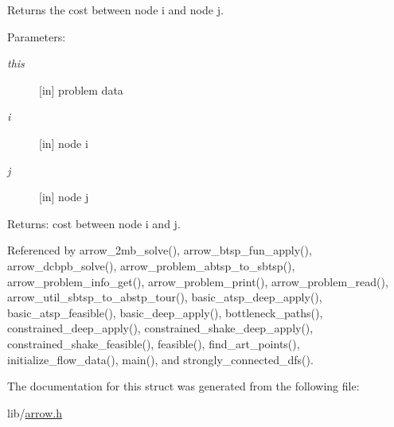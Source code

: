 Returns the cost between node i and node j. 

\begin{Desc}
\item[Parameters:]
\begin{description}
\item[{\em this}]\mbox{[}in\mbox{]} problem data \item[{\em i}]\mbox{[}in\mbox{]} node i \item[{\em j}]\mbox{[}in\mbox{]} node j \end{description}
\end{Desc}
\begin{Desc}
\item[Returns:]cost between node i and j. \end{Desc}


Referenced by arrow\_\-2mb\_\-solve(), arrow\_\-btsp\_\-fun\_\-apply(), arrow\_\-dcbpb\_\-solve(), arrow\_\-problem\_\-abtsp\_\-to\_\-sbtsp(), arrow\_\-problem\_\-info\_\-get(), arrow\_\-problem\_\-print(), arrow\_\-problem\_\-read(), arrow\_\-util\_\-sbtsp\_\-to\_\-abstp\_\-tour(), basic\_\-atsp\_\-deep\_\-apply(), basic\_\-atsp\_\-feasible(), basic\_\-deep\_\-apply(), bottleneck\_\-paths(), constrained\_\-deep\_\-apply(), constrained\_\-shake\_\-deep\_\-apply(), constrained\_\-shake\_\-feasible(), feasible(), find\_\-art\_\-points(), initialize\_\-flow\_\-data(), main(), and strongly\_\-connected\_\-dfs().

The documentation for this struct was generated from the following file:\begin{CompactItemize}
\item 
lib/\hyperlink{arrow_8h}{arrow.h}\end{CompactItemize}
